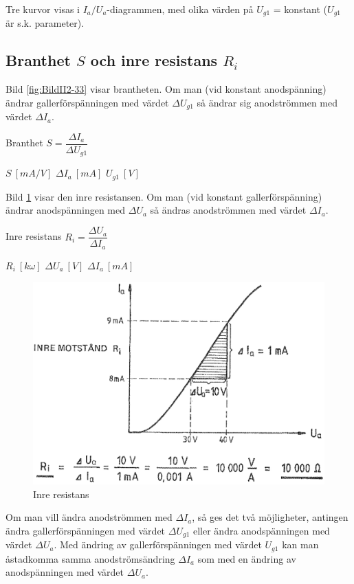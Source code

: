 Tre kurvor visas i \(I_a/U_a\)-diagrammen, med olika värden på
\(U_{g1}\) = konstant (\(U_{g1}\) är s.k. parameter).

\subsection{Branthet $S$ och inre resistans $R_i$}

Bild \ref{fig:BildII2-33} visar brantheten.
Om man (vid konstant anodspänning) ändrar gallerförspänningen med värdet
\(\Delta U_{g1}\) så ändrar sig anodströmmen med värdet \(\Delta I_a\).

Branthet \(S = \dfrac{\Delta I_a}{\Delta U_{g1}}\)

\(S\ [mA/V]\) \(\Delta I_a\ [mA]\) \(U_{g1}\ [V]\)

Bild \ref{fig:BildII2-34} visar den inre resistansen.
Om man (vid konstant gallerförspänning) ändrar anodspänningen med
\(\Delta U_a\) så ändras anodströmmen med värdet \(\Delta I_a\).

Inre resistans \(R_i = \dfrac{\Delta U_a}{\Delta I_a}\)

\(R_i\ [k \omega]\)  \(\Delta U_a\ [V]\)  \(\Delta I_a\ [mA]\)

\begin{figure}[h]
\includegraphics[width=\textwidth]{images/cropped_pdfs/bild_2_2-34.pdf}
\caption{Inre resistans}
\label{fig:BildII2-34}
\end{figure}

Om man vill ändra anodströmmen med \(\Delta I_a\), så ges det två möjligheter,
antingen ändra gallerförspänningen med värdet \(\Delta U_{g1}\)
eller ändra anodspänningen med värdet \(\Delta U_a\).
Med ändring av gallerförspänningen med värdet \(U_{g1}\) kan man åstadkomma
samma anodströmsändring \(\Delta I_a\) som med en ändring av anodspänningen
med värdet \(\Delta U_a\).

